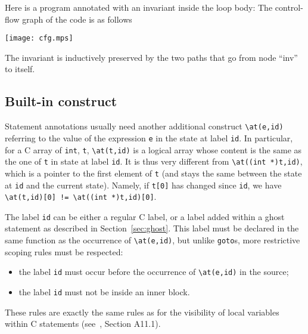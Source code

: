 \begin{example}
Here is a program annotated with an invariant inside the loop body:
The control-flow graph of the code is as follows
\begin{center}
\texttt{[image: cfg.mps]}
\end{center}
The invariant is inductively preserved by the two paths that go from
node ``inv'' to itself.
\end{example}

\begin{example}

\end{example}

\subsection{Built-in construct \texorpdfstring{\at}{\textbackslash{}at}}
\label{sec:at}
 Statement annotations usually need another additional
construct \lstinline|\at(e,id)| referring to the value of the
expression \lstinline|e| in the state at label \lstinline|id|. 
In particular, for a C array of \lstinline|int|, 
\lstinline|t|, \lstinline|\at(t,id)| is a logical
array whose content is the same as the one of \lstinline|t| in state at label
\lstinline|id|. It is thus very different from 
\lstinline|\at((int *)t,id)|, which
is a pointer to the first element of \lstinline|t| (and stays the same between 
the state at \lstinline|id| and the current state). Namely, if 
\lstinline|t[0]| has changed since \lstinline|id|, we have
\lstinline|\at(t,id)[0] != \at((int *)t,id)[0]|.

The label \lstinline|id| can be either a regular C label, or a label added
within a ghost statement as described in Section~\ref{sec:ghost}. This
label must be declared in the same function as the occurrence of
\lstinline|\at(e,id)|, but unlike \lstinline|goto|s, more restrictive
scoping rules must be respected:
\begin{itemize}
\item the label \lstinline|id| must occur before the occurrence of
\lstinline|\at(e,id)|
  in the source;
\item the label \lstinline|id| must not be inside an inner block.
\end{itemize}
These rules are exactly the same rules as for the visibility of local
variables within C statements (see~\cite{KR88}, Section A11.1).

